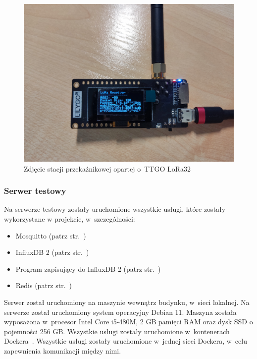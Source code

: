 \begin{figure}[b!]
    \begin{center}
        \includegraphics[width=13cm]{pic/stacja1.jpg}
    \end{center}
    \caption{Zdjęcie stacji przekaźnikowej opartej o~TTGO LoRa32}\label{rys:stacja1}
\end{figure}


\subsubsection{Serwer testowy}
Na serwerze testowy zostały uruchomione wszystkie usługi, które zostały wykorzystane w projekcie, w~szczególności:
\begin{itemize}
    \item Mosquitto (patrz str.~\pageref{impl:mosquitto})
    \item InfluxDB 2 (patrz str.~\pageref{impl:db})
    \item Program zapisujący do InfluxDB 2 (patrz str.~\pageref{impl:save})
    \item Redis (patrz str.~\pageref{impl:redis})
\end{itemize}
Serwer został uruchomiony na maszynie wewnątrz budynku, w~sieci lokalnej.
Na serwerze został uruchomiony system operacyjny Debian 11.
Maszyna została wyposażona w~procesor Intel Core i5-480M, 2 GB pamięci RAM oraz dysk SSD o pojemności 256 GB.
Wszystkie usługi zostały uruchomione w~kontenerach Dockera~\cite{tool:docker}.
Wszystkie usługi zostały uruchomione w~jednej sieci Dockera, w~celu zapewnienia komunikacji między nimi.

